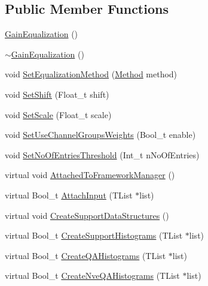 \subsection*{Public Member Functions}
\begin{DoxyCompactItemize}
\item 
\mbox{\hyperlink{classQn_1_1GainEqualization_a5fc21a456890d31c36c405ed05c2e886}{Gain\+Equalization}} ()
\item 
\mbox{\hyperlink{classQn_1_1GainEqualization_a29526efb0749db5c5436edae080aea93}{$\sim$\+Gain\+Equalization}} ()
\item 
void \mbox{\hyperlink{classQn_1_1GainEqualization_a9e255e692f67af4a534017bc9d0ae630}{Set\+Equalization\+Method}} (\mbox{\hyperlink{classQn_1_1GainEqualization_ab49157ee7419c78638467d5a070c2c23}{Method}} method)
\item 
void \mbox{\hyperlink{classQn_1_1GainEqualization_acb1f9095161f3beb43d9011bc7805303}{Set\+Shift}} (Float\+\_\+t shift)
\item 
void \mbox{\hyperlink{classQn_1_1GainEqualization_a597dc9f7f5a6f7e1ec01eb907253f572}{Set\+Scale}} (Float\+\_\+t scale)
\item 
void \mbox{\hyperlink{classQn_1_1GainEqualization_af136135624a62a1372fcf31548b358d7}{Set\+Use\+Channel\+Groups\+Weights}} (Bool\+\_\+t enable)
\item 
void \mbox{\hyperlink{classQn_1_1GainEqualization_aa21fb2cf56b3fc4b7fc8d7c0c2a99da3}{Set\+No\+Of\+Entries\+Threshold}} (Int\+\_\+t n\+No\+Of\+Entries)
\item 
virtual void \mbox{\hyperlink{classQn_1_1GainEqualization_a487cc533ff299196a16d0ee4688d1039}{Attached\+To\+Framework\+Manager}} ()
\item 
virtual Bool\+\_\+t \mbox{\hyperlink{classQn_1_1GainEqualization_a167a6348fcdf8c0f48cb16a3dd9d1c29}{Attach\+Input}} (T\+List $\ast$list)
\item 
virtual void \mbox{\hyperlink{classQn_1_1GainEqualization_a3b1da6e8711ef1e7dea394d3612ee8f9}{Create\+Support\+Data\+Structures}} ()
\item 
virtual Bool\+\_\+t \mbox{\hyperlink{classQn_1_1GainEqualization_a3f34cc42fe078c556d9acf98525490ce}{Create\+Support\+Histograms}} (T\+List $\ast$list)
\item 
virtual Bool\+\_\+t \mbox{\hyperlink{classQn_1_1GainEqualization_a52c68c9bb9632a1e56341dff9e360362}{Create\+Q\+A\+Histograms}} (T\+List $\ast$list)
\item 
virtual Bool\+\_\+t \mbox{\hyperlink{classQn_1_1GainEqualization_aede344344f1f7009f10fc798cfa3241b}{Create\+Nve\+Q\+A\+Histograms}} (T\+List $\ast$list)

\end{DoxyCompactItemize}
